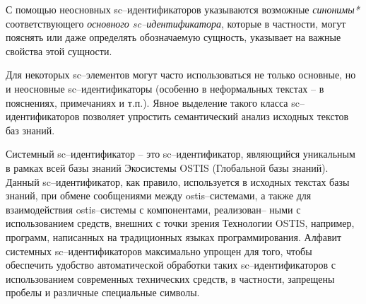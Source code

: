 С помощью неосновных sc--идентификаторов указываются возможные \textit{синонимы*} соответствующего \textit{основного sc--идентификатора}, которые в частности, могут пояснять или даже определять обозначаемую сущность, указывает на важные свойства этой сущности.

Для некоторых sc--элементов могут часто использоваться не только основные, но и неосновные sc--идентификаторы (особенно в неформальных текстах -- в пояснениях, примечаниях и т.п.). Явное выделение такого класса sc--идентификаторов позволяет упростить семантический анализ исходных текстов баз знаний.


Системный sc--идентификатор – это sc--идентификатор, являющийся уникальным в рамках
всей базы знаний Экосистемы OSTIS (Глобальной базы знаний). Данный sc--идентификатор,
как правило, используется в исходных текстах базы знаний, при обмене сообщениями между
ostis--системами, а также для взаимодействия ostis--системы с компонентами, реализован--
ными с использованием средств, внешних с точки зрения Технологии OSTIS, например,
программ, написанных на традиционных языках программирования. Алфавит системных
sc--идентификаторов максимально упрощен для того, чтобы обеспечить удобство автоматической обработки таких sc--идентификаторов с использованием современных технических
средств, в частности, запрещены пробелы и различные специальные символы.


